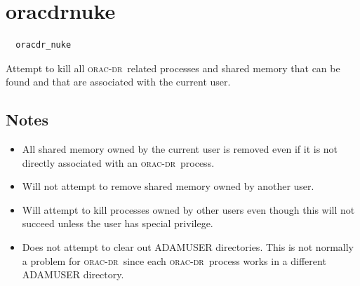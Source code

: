 \documentclass[twoside,11pt]{article}
\renewcommand{\_}{\texttt{\symbol{95}}}
\newcommand{\oracdr}{\textsc{orac-dr}}
\begin{document}
\section{oracdr\_nuke\label{oracdr_nuke}}

\begin{verbatim}
  oracdr_nuke
\end{verbatim}

Attempt to kill all \oracdr\ related processes and shared memory that
can be found and that are associated with the current user.

\subsection*{Notes\label{oracdr_nuke_NOTES}}\begin{itemize}
\item 

All shared memory owned by the current user is removed even if
it is not directly associated with an \oracdr\ process.

\item 

Will not attempt to remove shared memory owned by another user.

\item 

Will attempt to kill processes owned by other users even though
this will not succeed unless the user has special privilege.

\item 

Does not attempt to clear out ADAM\_USER directories. This is not
normally a problem for \oracdr\ since each \oracdr\ process works
in a different ADAM\_USER directory.

\end{itemize}

\end{document}
